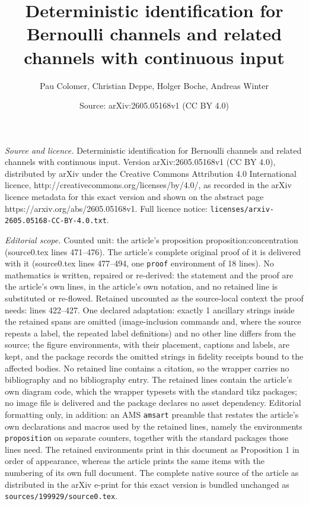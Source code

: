 \documentclass[10pt,a4paper]{amsart}
\title{Deterministic identification for Bernoulli channels and related channels with continuous input}
\author{Pau Colomer, Christian Deppe, Holger Boche, Andreas Winter}
\date{Source: arXiv:2605.05168v1 (CC BY 4.0)}
\begin{document}
\maketitle

\noindent\emph{Source and licence.} Deterministic identification for Bernoulli channels and related channels with continuous input. Version arXiv:2605.05168v1 (CC BY 4.0), distributed by arXiv under the Creative Commons Attribution 4.0 International licence, http://creativecommons.org/licenses/by/4.0/, as recorded in the arXiv licence metadata for this exact version and shown on the abstract page https://arxiv.org/abs/2605.05168v1. Full licence notice: \texttt{licenses/arxiv-2605.05168-CC-BY-4.0.txt}.\par\smallskip

\noindent\textit{Editorial scope.} Counted unit: the article's proposition proposition:concentration (source0.tex lines 471--476). The article's complete original proof of it is delivered with it (source0.tex lines 477--494, one \texttt{proof} environment of 18 lines). No mathematics is written, repaired or re-derived: the statement and the proof are the article's own lines, in the article's own notation, and no retained line is substituted or re-flowed.  Retained uncounted as the source-local context the proof needs: lines 422--427.  One declared adaptation: exactly 1 ancillary strings inside the retained spans are omitted (image-inclusion commands and, where the source repeats a label, the repeated label definitions) and no other line differs from the source; the figure environments, with their placement, captions and labels, are kept, and the package records the omitted strings in fidelity receipts bound to the affected bodies.  No retained line contains a citation, so the wrapper carries no bibliography and no bibliography entry.  The retained lines contain the article's own diagram code, which the wrapper typesets with the standard tikz packages; no image file is delivered and the package declares no asset dependency.  Editorial formatting only, in addition: an AMS \texttt{amsart} preamble that restates the article's own declarations and macros used by the retained lines, namely the environments \texttt{proposition} on separate counters, together with the standard packages those lines need.  The retained environments print in this document as Proposition 1 in order of appearance, whereas the article prints the same items with the numbering of its own full document.  The complete native source of the article as distributed in the arXiv e-print for this exact version is bundled unchanged as \texttt{sources/199929/source0.tex}.
\end{document}
